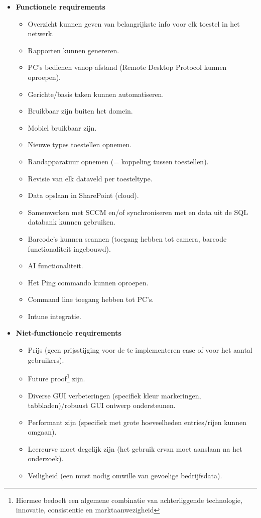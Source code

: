 \begin{itemize}
    \item \textbf{Functionele requirements}
    \begin{itemize}
        \item Overzicht kunnen geven van belangrijkste info voor elk toestel in het netwerk.
        \item Rapporten kunnen genereren.
        \item PC's bedienen vanop afstand (Remote Desktop Protocol kunnen oproepen).
        \item Gerichte/basis taken kunnen automatiseren.
        \item Bruikbaar zijn buiten het domein.
        \item Mobiel bruikbaar zijn.
        \item Nieuwe types toestellen opnemen.
        \item Randapparatuur opnemen (= koppeling tussen toestellen).
        \item Revisie van elk dataveld per toesteltype.
        \item Data opslaan in SharePoint (cloud).
        \item Samenwerken met SCCM en/of synchroniseren met en data uit de SQL databank kunnen gebruiken.
        \item Barcode's kunnen scannen (toegang hebben tot camera, barcode functionaliteit ingebouwd).
        \item AI functionaliteit.
        \item Het Ping commando kunnen oproepen.
        \item Command line toegang hebben tot PC's.
        \item Intune integratie.
    \end{itemize}
    \item \textbf{Niet-functionele requirements}
    \begin{itemize}
        \item Prijs (geen prijsstijging voor de te implementeren case of voor het aantal gebruikers).
        \item Future proof\footnote{Hiermee bedoelt een algemene combinatie van achterliggende technologie, innovatie, consistentie en marktaanwezigheid} zijn.
        \item Diverse GUI verbeteringen (specifiek kleur markeringen, tabbladen)/robuust GUI ontwerp ondersteunen.
        \item Performant zijn (specifiek met grote hoeveelheden entries/rijen kunnen omgaan).
        \item Leercurve moet degelijk zijn (het gebruik ervan moet aanslaan na het onderzoek).
        \item Veiligheid (een must nodig omwille van gevoelige bedrijfsdata).
    \end{itemize}
\end{itemize}

